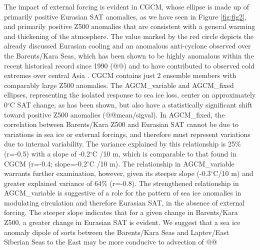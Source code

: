 \documentclass{nature}
\begin{document}
The impact of external forcing is evident in CGCM, whose ellipse is made up of primarily positive Eurasian SAT anomalies, as we have seen in Figure \ref{fig:fig2}, and primarily positive Z500 anomalies that are consistent with a general warming and thickening of the atmosphere. The value marked by the red circle depicts the already discussed Eurasian cooling and an anomalous anti-cyclone observed over the Barents/Kara Seas, which has been shown to be highly anomalous within the recent historical record since 1990 (@@) and to have contributed to observed cold extremes over central Asia \cite{horton15}. CGCM contains just 2 ensemble members with comparably large Z500 anomalies. The AGCM\_variable and AGCM\_fixed ellipses, representing the isolated response to sea ice loss, center on approximately 0$^\circ$C SAT change, as has been shown, but also have a statistically significant shift toward positive Z500 anomalies (@@mean/sigval). In AGCM\_fixed, the correlation between Barents/Kara Z500 and Eurasian SAT cannot be due to variations in sea ice or external forcings, and therefore must represent variations due to internal variability. The variance explained by this relationship is 25\% (r=-0.5) with a slope of -0.2$^\circ$C /10 m, which is comparable to that found in CGCM (r=-0.4; slope=-0.2$^\circ$C /10 m). The relationship in AGCM\_variable warrants further examination, however, given its steeper slope (-0.3$^\circ$C/10 m) and greater explained variance of 64\% (r=-0.8). The strengthened relationship in AGCM\_variable is suggestive of a role for the pattern of sea ice anomalies in modulating circulation and therefore Eurasian SAT, in the absence of external forcing. The steeper slope indicates that for a given change in Barents/Kara Z500, a greater change in Eurasian SAT is evident. We suggest that a sea ice anomaly dipole of sorts between the Barents/Kara Seas and Laptev/East Siberian Seas to the East may be more conducive to advection of @@

\end{document}
